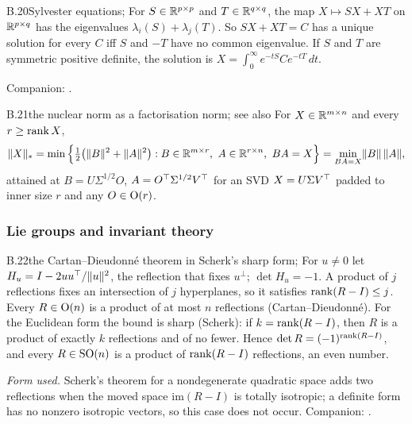 \begin{auxresult}{B.20}{Sylvester equations}{\citep{xbhatia1997how}; \citep[Ch.~4]{xhorn1991topics}}
For $S\in\mathbb{R}^{p\times p}$ and $T\in\mathbb{R}^{q\times q}$, the map $X\mapsto SX+XT$ on $\mathbb{R}^{p\times q}$ has the eigenvalues
$\lambda_i(S)+\lambda_j(T)$. So $SX+XT=C$ has a unique solution for every $C$ iff $S$ and $-T$ have no common
eigenvalue. If $S$ and $T$ are symmetric positive definite, the solution is $X=\int_0^\infty e^{-tS}Ce^{-tT}\,dt$.
\end{auxresult}
\noindent Companion: .

\begin{auxresult}{B.21}{the nuclear norm as a factorisation norm}{\citep[Lemma~1]{xsrebro2004maximum};
see also \citet{xrecht2010guaranteed}}
For $X\in\mathbb{R}^{m\times n}$ and every $r\ge\operatorname{rank} X$,
\begin{equation*}
  \lVert X\rVert_*=\min\Big\{\tfrac12\big(\lVert B\rVert^2+\lVert A\rVert^2\big):B\in\mathbb{R}^{m\times r},\ A\in\mathbb{R}^{r\times n},
  \ BA=X\Big\}=\min_{BA=X}\lVert B\rVert\,\lVert A\rVert ,
\end{equation*}
attained at $B=U\Sigma^{1/2}O$, $A=O^{\top}\Sigma^{1/2}V^{\top}$ for an SVD $X=U\Sigma V^{\top}$ padded to inner size $r$ and any
$O\in\mathrm{O}(r)$.
\end{auxresult}

\subsubsection{Lie groups and invariant theory}

\begin{auxresult}{B.22}{the Cartan--Dieudonné theorem in Scherk's sharp form}{\citep{xscherk1950decomposition};
\citep[Ch.~III]{xartin1957geometric}}
For $u\ne0$ let $H_u=I-2uu^{\top}/\lVert u\rVert^2$, the reflection that fixes $u^\perp$; $\det H_u=-1$. A product of $j$
reflections fixes an intersection of $j$ hyperplanes, so it satisfies $\operatorname{rank}(R-I)\le j$. Every $R\in\mathrm{O}(n)$ is a product
of at most $n$ reflections (Cartan--Dieudonné). For the Euclidean form the bound is sharp (Scherk): if
$k=\operatorname{rank}(R-I)$, then $R$ is a product of exactly $k$ reflections and of no fewer. Hence $\det R=(-1)^{\operatorname{rank}(R-I)}$, and every
$R\in\mathrm{SO}(n)$ is a product of $\operatorname{rank}(R-I)$ reflections, an even number.
\end{auxresult}
\noindent\emph{Form used.} Scherk's theorem for a nondegenerate quadratic space adds two reflections when the moved space
$\mathrm{im}(R-I)$ is totally isotropic; a definite form has no nonzero isotropic vectors, so this case does not occur.
Companion: .

